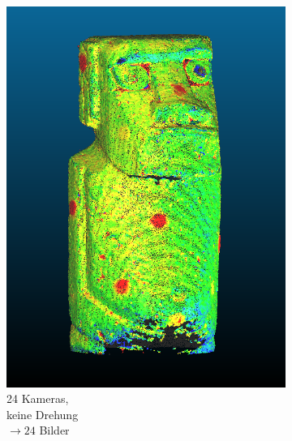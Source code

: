 \documentclass[./00PhotoBox.tex]{subfiles}
\begin{document}
\begin{figure}
    \centering
    \begin{subfigure}{0.30\textwidth}
        \includegraphics[width=1\linewidth]{img/cam_anzahl/normal.png}
        \centering
        \caption{
            24 Kameras,\\
            keine Drehung\\
            $\rightarrow 24$ Bilder
        }
        \label{img:moai_normal}
    \end{subfigure}
    \begin{subfigure}{0.30\textwidth}

\end{subfigure}
\end{figure}
\end{document}
